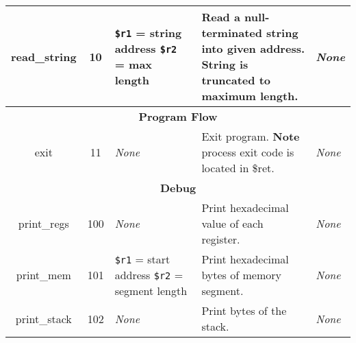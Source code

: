 \documentclass[10pt]{article}
\begin{document}
\begin{longtable}{|c|c|l|l|l|}
        \hline
        read\_string & 10 & \makecell[l]{\texttt{\$r1} = string address\\%
        \texttt{\$r2} = max length} & \makecell[l]{Read a null-terminated string into given address.\\%
        String is truncated to maximum length.} & \textit{None} \\
        \hline \hline
        \multicolumn{5}{|c|}{\textbf{Program Flow}} \\
        \hline
        exit & 11 & \textit{None} & \makecell[l]{Exit program.\\%
        \textbf{Note} process exit code is located in \$ret.} & \textit{None} \\
        \hline \hline
        \multicolumn{5}{|c|}{\textbf{Debug}} \\
        \hline
        print\_regs & 100 & \textit{None} & Print hexadecimal value of each register. & \textit{None} \\
        \hline
        print\_mem & 101 & \makecell[l]{\texttt{\$r1} = start address\\%
        \texttt{\$r2} = segment length} & Print hexadecimal bytes of memory segment. & \textit{None} \\
        \hline
        print\_stack & 102 & \textit{None} & Print bytes of the stack. & \textit{None} \\
        \hline
    \end{longtable}
\end{document}
